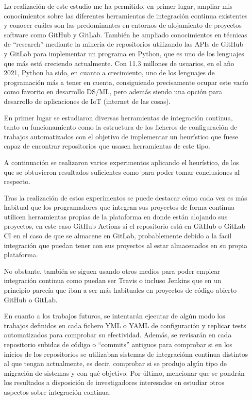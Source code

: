 La realización de este estudio me ha permitido, en primer lugar, ampliar mis conocimientos sobre las diferentes herramientas de integración continua existentes y conocer cuáles son las predominantes en entornos de alojamiento de proyectos software como GitHub y GitLab.
También he ampliado conocimientos en técnicas de ``research'' mediante la minería de repositorios utilizando las APIs de GitHub y GitLab para implementar un programa en Python, que es uno de los lenguajes que más está creciendo actualmente. 
Con 11.3 millones de usuarios, en el año 2021, Python ha sido, en cuanto a crecimiento, uno de los lenguajes de programación más a tener en cuenta, consiguiendo precisamente ocupar este vacío como favorito en desarrollo DS/ML, pero además siendo una opción para desarrollo de aplicaciones de IoT (internet de las cosas).

En primer lugar se estudiaron diversas herramientas de integración continua, tanto su funcionamiento como la estructura de los ficheros de configuración de trabajos automatizados con el objetivo de implementar un heurístico que fuese capaz de encontrar repositorios que usasen herramientas de este tipo.

A continuación se realizaron varios experimentos aplicando el heurístico, de los que se obtuvieron resultados suficientes como para poder tomar conclusiones al respecto.

Tras la realización de estos experimentos se puede destacar cómo cada vez es más habitual que los programadores que integran sus proyectos de forma continua utilicen herramientas propias de la plataforma en donde están alojando sus proyectos, en este caso GitHub Actions si el repositorio está en GitHub o GitLab CI en el caso de que se almacene en GitLab, probablemente debido a la facil integración que puedan tener con sus proyectos al estar almacenados en su propia plataforma.

No obstante, también se siguen usando otros medios para poder emplear integración continua como puedan ser Travis o incluso Jenkins que en un principio parecía que iban a ser más habituales en proyectos de código abierto GitHub o GitLab.

En cuanto a los trabajos futuros, se intentarán ejecutar de algún modo los trabajos definidos en cada fichero YML o YAML de configuración y replicar tests automatizados para comprobar su efectividad. Además, se revisarán en cada repositorio subidas de código o ``commits'' antiguos para comprobar si en los inicios de los repositorios se utilizaban sistemas de integraciónn continua distintos al que tengan actualmente, es decir, comprobar si se produjo algún tipo de migración de sistemas y con qué objetivo. Por último, mencionar que se pondrán los resultados a disposición de investigadores interesados en estudiar otros aspectos sobre integración continua.
